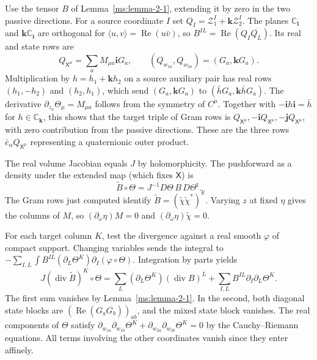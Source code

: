 Use the tensor $B$ of Lemma~\ref{ms:lemma-2-1}, extending it by zero in the two passive directions. For a source coordinate $I$ set $Q_I=\mathcal Z_1^I+\mathbf k\mathcal Z_2^I$. The planes $\mathbb C_{\mathbf i}$ and $\mathbf k\mathbb C_{\mathbf i}$ are orthogonal for $\langle u,v\rangle=\operatorname{Re}(u\bar v)$, so $B^{IL}=\operatorname{Re}(Q_I\overline{Q_L})$. Its real and state rows are
\[
Q_{\mathsf X^\mu}=\sum_aM_{\mu a}\mathbf i G_a,\qquad
(Q_{w_{1a}},Q_{w_{2a}})=(G_a,\mathbf k G_a).
\]
Multiplication by $h=h_1+\mathbf k h_2$ on a source auxiliary pair has real rows $(h_1,-h_2)$ and $(h_2,h_1)$, which send $(G_a,\mathbf kG_a)$ to $(\bar hG_a,\mathbf k\bar hG_a)$. The derivative $\partial_{z_a}\Theta_\mu=M_{\mu a}$ follows from the symmetry of $C^\mu$. Together with $-\mathbf i h\mathbf i=\bar h$ for $h\in\mathbb C_{\mathbf k}$, this shows that the target triple of Gram rows is $Q_{\mathsf X^\mu},-\mathbf iQ_{\mathsf X^\mu},-\mathbf jQ_{\mathsf X^\mu}$, with zero contribution from the passive directions. These are the three rows $\bar e_\alpha Q_{\mathsf X^\mu}$ representing a quaternionic outer product.

The real volume Jacobian equals $J$ by holomorphicity. The pushforward as a density under the extended map (which fixes $\mathsf X$) is
\[
\widetilde B\circ\Theta=J^{-1}D\Theta\,B\,D\Theta^{\mathsf t}.
\]
The Gram rows just computed identify $\widetilde B=(\widetilde\chi\widetilde\chi^*)^{\mathbb R}$. Varying $z$ at fixed $\eta$ gives the columns of $M$, so $(\partial_\omega\eta)M=0$ and $(\partial_\omega\eta)\widetilde\chi=0$.

For each target column $K$, test the divergence against a real smooth $\varphi$ of compact support. Changing variables sends the integral to $-\sum_{I,L}\int B^{IL}(\partial_L\Theta^K)\partial_I(\varphi\circ\Theta)$. Integration by parts yields
\[
J(\operatorname{div}\widetilde B)^K\circ\Theta
=\sum_L(\partial_L\Theta^K)(\operatorname{div}B)^L
 +\sum_{I,L} B^{IL}\partial_I\partial_L\Theta^K.
\]
The first sum vanishes by Lemma~\ref{ms:lemma-2-1}. In the second, both diagonal state blocks are $(\operatorname{Re}(G_a\overline{G_b}))_{ab}$, and the mixed state block vanishes. The real components of $\Theta$ satisfy $\partial_{w_{1a}}\partial_{w_{1b}}\Theta^K+\partial_{w_{2a}}\partial_{w_{2b}}\Theta^K=0$ by the Cauchy--Riemann equations. All terms involving the other coordinates vanish since they enter affinely.
